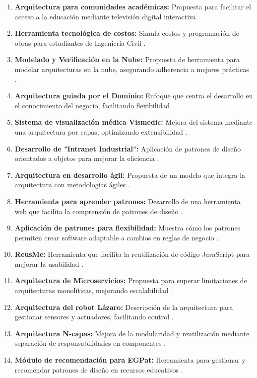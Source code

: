 \documentclass[twocolumn]{article}
\begin{document}
\begin{enumerate}
    \item \textbf{Arquitectura para comunidades académicas:} Propuesta para facilitar el acceso a la educación mediante televisión digital interactiva \cite{campo2013}.
    \item \textbf{Herramienta tecnológica de costos:} Simula costos y programación de obras para estudiantes de Ingeniería Civil \cite{lazo2004}.
    \item \textbf{Modelado y Verificación en la Nube:} Propuesta de herramienta para modelar arquitecturas en la nube, asegurando adherencia a mejores prácticas \cite{murillo2019}.
    \item \textbf{Arquitectura guiada por el Dominio:} Enfoque que centra el desarrollo en el conocimiento del negocio, facilitando flexibilidad \cite{escobar2021}.
    \item \textbf{Sistema de visualización médica Vismedic:} Mejora del sistema mediante una arquitectura por capas, optimizando extensibilidad \cite{vismedic2020}.
    \item \textbf{Desarrollo de "Intranet Industrial":} Aplicación de patrones de diseño orientados a objetos para mejorar la eficiencia \cite{lazo2004}.
    \item \textbf{Arquitectura en desarrollo ágil:} Propuesta de un modelo que integra la arquitectura con metodologías ágiles \cite{navarro2018}.
    \item \textbf{Herramienta para aprender patrones:} Desarrollo de una herramienta web que facilita la comprensión de patrones de diseño \cite{ferrandis2021}.
    \item \textbf{Aplicación de patrones para flexibilidad:} Muestra cómo los patrones permiten crear software adaptable a cambios en reglas de negocio \cite{escalante2014}.
    \item \textbf{ReusMe:} Herramienta que facilita la reutilización de código JavaScript para mejorar la usabilidad \cite{benigni2009}.
    \item \textbf{Arquitectura de Microservicios:} Propuesta para superar limitaciones de arquitecturas monolíticas, mejorando escalabilidad \cite{lopez2017}.
    \item \textbf{Arquitectura del robot Lázaro:} Descripción de la arquitectura para gestionar sensores y actuadores, facilitando control \cite{garcia2018}.
    \item \textbf{Arquitectura N-capas:} Mejora de la modularidad y reutilización mediante separación de responsabilidades en componentes \cite{cardacci2015}.
    \item \textbf{Módulo de recomendación para EGPat:} Herramienta para gestionar y recomendar patrones de diseño en recursos educativos \cite{azcuy2021}.

\end{enumerate}
\end{document}
